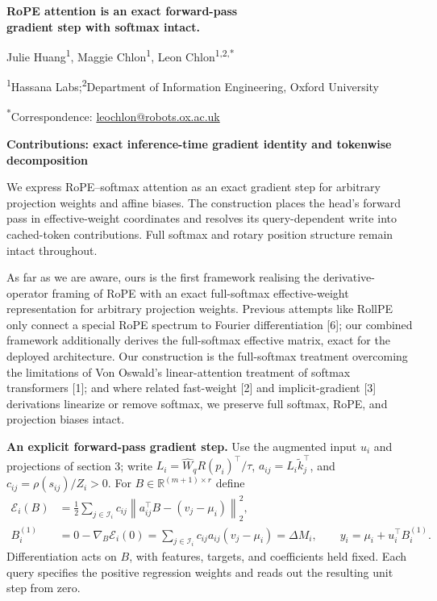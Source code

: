 \documentclass[10pt,a4paper]{article}
\newcommand{\R}{\mathbb R}
\newcommand{\T}{^{\!\top}}
\newcommand{\calI}{\mathcal I}
\newcommand{\ddM}{\Delta M}
\newcommand{\norm}[1]{\left\lVert#1\right\rVert}
\begin{document}
\fontsize{10}{15.8}\selectfont
\begin{center}
{\fontsize{16}{19}\selectfont\bfseries RoPE attention is an exact forward-pass\\gradient step with softmax intact.}\par
\vspace{6pt}
{\fontsize{11.5}{15}\selectfont Julie Huang\textsuperscript{1}, Maggie Chlon\textsuperscript{1}, Leon Chlon\textsuperscript{1,2,*}}\par
{\fontsize{10.5}{14}\selectfont \textsuperscript{1}Hassana Labs;\quad\textsuperscript{2}Department of Information Engineering, Oxford University}\par
{\fontsize{10.5}{14}\selectfont \textsuperscript{*}Correspondence: \href{mailto:leochlon@robots.ox.ac.uk}{leochlon@robots.ox.ac.uk}}
\end{center}
\vspace{-3pt}
\fontsize{10}{15.8}\selectfont
\setlength{\parskip}{10pt}

\textbf{Contributions: exact inference-time gradient identity and tokenwise decomposition}

We express RoPE--softmax attention as an exact gradient step for arbitrary projection
weights and affine biases. The construction places the head's forward pass in
effective-weight coordinates and resolves its query-dependent write into cached-token
contributions. Full softmax and rotary position structure remain intact throughout.

As far as we are aware, ours is the first framework realising the derivative-operator
framing of RoPE with an exact full-softmax effective-weight representation for arbitrary
projection weights. Previous attempts like RollPE only connect a special RoPE spectrum to
Fourier differentiation [6]; our combined framework additionally derives the full-softmax
effective matrix, exact for the deployed architecture. Our construction is the full-softmax
treatment overcoming the limitations of Von Oswald's linear-attention treatment of softmax
transformers [1]; and where related fast-weight [2] and implicit-gradient [3] derivations
linearize or remove softmax, we preserve full softmax, RoPE, and projection biases intact.

\textbf{An explicit forward-pass gradient step.}
Use the augmented input $u_i$ and projections of section 3; write
$L_i=\widehat W_qR(p_i)\T/\tau$, $a_{ij}=L_i\widetilde k_j\T$, and
$c_{ij}=\rho(s_{ij})/Z_i>0$. For $B\in\R^{(m+1)\times r}$ define
\begin{equation}
\boxed{\begin{aligned}
\mathcal E_i(B)&=\frac12\sum_{j\in\calI_i}c_{ij}
 \norm{a_{ij}\T B-(v_j-\mu_i)}_2^2,\\
B_i^{(1)}&=0-\nabla_B\mathcal E_i(0)
 =\sum_{j\in\calI_i}c_{ij}a_{ij}(v_j-\mu_i)=\ddM_i,
\qquad y_i=\mu_i+u_i\T B_i^{(1)}.
\end{aligned}}
\label{eq:regression}
\end{equation}
Differentiation acts on $B$, with features, targets, and coefficients held fixed.
Each query specifies the positive regression weights and reads out the resulting
unit step from zero.
\end{document}
